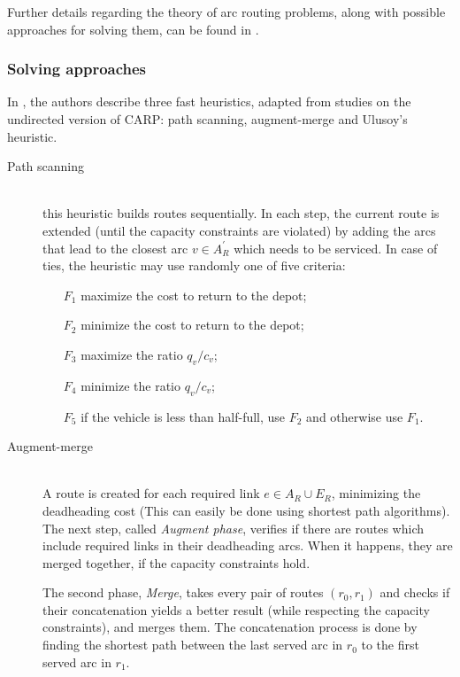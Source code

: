 Further details regarding the theory of arc routing problems, along with
possible approaches for solving them, can be found in \citet{Dror00,Assad95}.





\subsubsection{Solving approaches}
\label{section:mcarp-approaches}

In \citet{Belenguer06}, the authors describe three fast heuristics, adapted
from studies on the undirected version of CARP: path scanning, augment-merge
and Ulusoy's heuristic. 

\begin{description}
\item[Path scanning] \hfill \\
this heuristic builds routes sequentially. In each step, the current route is
extended (until the capacity constraints are violated) by adding the arcs that
lead to the closest arc $v \in A_R^\prime$ which needs to be serviced. In case
of ties, the heuristic may use randomly one of five criteria:
\begin{itemize}
	\item[$F_1$] maximize the cost to return to the depot;
	\item[$F_2$] minimize the cost to return to the depot;
	\item[$F_3$] maximize the ratio $q_v/c_v$;
	\item[$F_4$] minimize the ratio $q_v/c_v$;
	\item[$F_5$] if the vehicle is less than half-full, use $F_2$ and otherwise use $F_1$.
\end{itemize}

\item[Augment-merge] \hfill \\
A route is created for each required link $e \in A_R \cup E_R$, minimizing the
deadheading cost (This can easily be done using shortest path algorithms). The
next step, called \textit{Augment phase}, verifies if there are routes which
include required links in their deadheading arcs. When it happens, they are
merged together, if the capacity constraints hold.

The second phase, \textit{Merge}, takes every pair of routes $(r_0, r_1)$ and
checks if their concatenation yields a better result (while respecting the
capacity constraints), and merges them. The concatenation process is done by
finding the shortest path between the last served arc in $r_0$ to the first
served arc in $r_1$.


\end{description}
